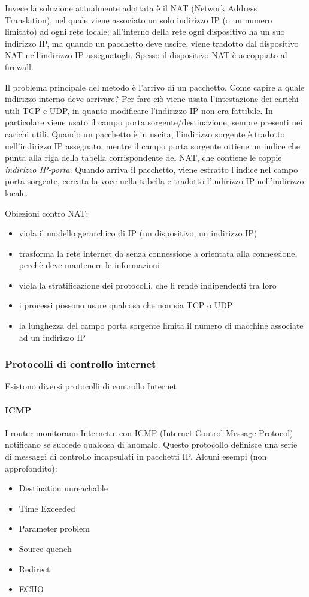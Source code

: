 Invece la soluzione attualmente adottata è il NAT (Network Address Translation), nel quale viene associato un solo indirizzo IP (o un numero limitato) ad ogni rete locale;
all'interno della rete ogni dispositivo ha un suo indirizzo IP, ma quando un pacchetto deve uscire, viene tradotto dal dispositivo NAT nell'indirizzo IP assegnatogli.
Spesso il dispositivo NAT è accoppiato al firewall.

Il problema principale del metodo è l'arrivo di un pacchetto.
Come capire a quale indirizzo interno deve arrivare?
Per fare ciò viene usata l'intestazione dei carichi utili TCP e UDP, in quanto modificare l'indirizzo IP non era fattibile.
In particolare viene usato il campo porta sorgente/destinazione, sempre presenti nei carichi utili.
Quando un pacchetto è in uscita, l'indirizzo sorgente è tradotto nell'indirizzo IP assegnato, mentre il campo porta sorgente ottiene un indice che punta alla riga della tabella corrispondente del NAT, che contiene le coppie \textit{indirizzo IP-porta}.
Quando arriva il pacchetto, viene estratto l'indice nel campo porta sorgente, cercata la voce nella tabella e tradotto l'indirizzo IP nell'indirizzo locale.

Obiezioni contro NAT:
\begin{itemize}
\item viola il modello gerarchico di IP (un dispositivo, un indirizzo IP)
\item trasforma la rete internet da senza connessione a orientata alla connessione, perchè deve mantenere le informazioni
\item viola la stratificazione dei protocolli, che li rende indipendenti tra loro
\item i processi possono usare qualcosa che non sia TCP o UDP
\item la lunghezza del campo porta sorgente limita il numero di macchine associate ad un indirizzo IP
\end{itemize}

\subsubsection{Protocolli di controllo internet}
Esistono diversi protocolli di controllo Internet

\paragraph{ICMP}
I router monitorano Internet e con ICMP (Internet Control Message Protocol) notificano se succede qualcosa di anomalo.
Questo protocollo definisce una serie di messaggi di controllo incapsulati in pacchetti IP.
Alcuni esempi (non approfondito):
\begin{itemize}
\item Destination unreachable
\item Time Exceeded
\item Parameter problem
\item Source quench
\item Redirect
\item ECHO
\end{itemize}

